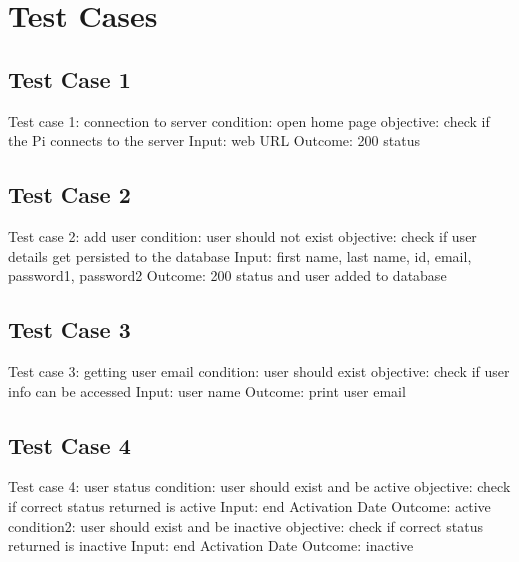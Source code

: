\documentclass[a4paper,12pt]{article}
\begin{document}
	\section{Test Cases}
		\subsection{Test Case 1}
		Test case 1: connection to server \newline
		condition: open home page \newline
		objective: check if the Pi connects to the server \newline
		Input: web URL \newline
		Outcome:  200 status \newline
		
	\subsection{Test Case 2}
		Test case 2: add user \newline
		condition:  user should not exist \newline
		objective: check if user details get persisted to the database
		Input: first name, last name, id, email, password1, password2 \newline
		Outcome: 200 status and user added to database \newline
		
		\subsection{Test Case 3}
		Test case 3: getting user email \newline
		condition:  user should exist \newline
		objective: check if user info can be accessed \newline  
		Input: user name \newline
		Outcome: print user email \newline
			
		\subsection{Test Case 4}
		Test case 4: user status \newline
		condition: user should exist and be active \newline
		objective: check if correct status returned is active \newline
		Input: end Activation Date \newline
		Outcome: active \newline
		\newline
		condition2: user should exist and be inactive \newline
		objective: check if correct status returned is inactive \newline
		Input: end Activation Date \newline
		Outcome: inactive \newline
		
\end{document}
